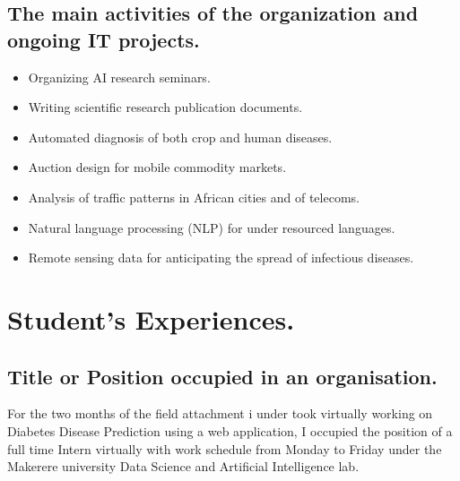 \documentclass[11pt]{article}
\begin{document}
\subsection{The main activities of the organization and ongoing IT projects.}
\begin{itemize}
	\item Organizing AI research seminars.\\
	\item Writing scientific research publication documents. \\
	\item Automated diagnosis of both crop and human diseases.\\
	\item Auction design for mobile commodity markets.\\
	\item Analysis of traffic patterns in African cities and of telecoms.\\
	\item Natural language processing (NLP) for under resourced languages.\\
	\item Remote sensing data for anticipating the spread of infectious diseases.\\
\end{itemize}

\newpage
\section{Student's Experiences.}\label{sec:intro}
\subsection{Title or Position occupied in an organisation.}
For the two months of the field attachment i under took virtually working on Diabetes Disease Prediction using a web application, I occupied the position of a full time Intern virtually with work schedule from Monday to Friday under the Makerere university Data Science and Artificial Intelligence lab. \\
\end{document}
